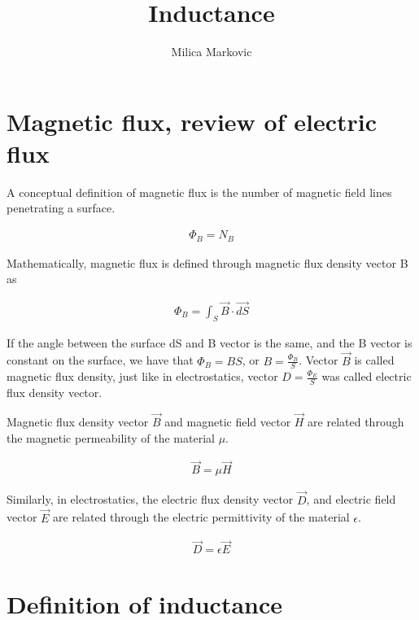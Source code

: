 \documentclass{ximera}
\title{Inductance}
\author{Milica Markovic}
\begin{document}
  
\begin{abstract}  

\end{abstract}  
\maketitle    


\section{Magnetic flux, review of electric flux}

A conceptual definition of magnetic flux is the number of magnetic field lines penetrating a surface. 

\begin{eqnarray}
\Phi_B= N_B 
\end{eqnarray}

Mathematically, magnetic flux is defined through magnetic flux density vector B as

\begin{eqnarray}
\Phi_B= \int_S \vec{B} \cdot \vec{dS}
\end{eqnarray}

If the angle between the surface dS and B vector is the same, and the B vector is constant on the surface, we have that $\Phi_B=B S$, or $B=\frac{\Phi_B}{S}$. Vector $\vec{B}$ is called magnetic flux density, just like in electrostatics, vector $D=\frac{\Phi_E}{S}$ was called electric flux density vector.

Magnetic flux density vector $\vec{B}$ and magnetic field vector $\vec{H}$ are related through the magnetic permeability of the material $\mu$.

\begin{eqnarray}
\vec{B} = \mu \vec{H}
\end{eqnarray}

Similarly, in electrostatics, the electric flux density vector $\vec{D}$, and electric field vector $\vec{E}$ are related through the electric permittivity of the material $\epsilon$.

\begin{eqnarray}
\vec{D} = \epsilon \vec{E}
\end{eqnarray}

\section{Definition of inductance}
 
\end{document}

